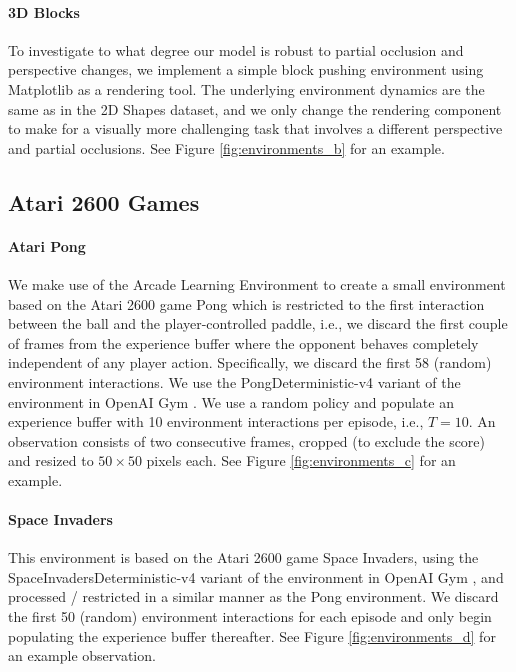 \documentclass{article} %
\begin{document}
\paragraph{3D Blocks}
To investigate to what degree our model is robust to partial occlusion and perspective changes, we implement a simple block pushing environment using Matplotlib \citep{hunter2007matplotlib} as a rendering tool. The underlying environment dynamics are the same as in the 2D Shapes dataset, and we only change the rendering component to make for a visually more challenging task that involves a different perspective and partial occlusions. See Figure \ref{fig:environments_b} for an example.

\subsection{Atari 2600 Games}
\paragraph{Atari Pong} We make use of the Arcade Learning Environment \citep{bellemare2013arcade} to create a small environment based on the Atari 2600 game Pong which is restricted to the first interaction between the ball and the player-controlled paddle, i.e., we discard the first couple of frames from the experience buffer where the opponent behaves completely independent of any player action. Specifically, we discard the first 58 (random) environment interactions. We use the {\sc PongDeterministic-v4} variant of the environment in OpenAI Gym \citep{brockman2016openai}. We use a random policy and populate an experience buffer with 10 environment interactions per episode, i.e., $T=10$. An observation consists of two consecutive frames, cropped (to exclude the score) and resized to $50\times50$ pixels each. See Figure \ref{fig:environments_c} for an example.

\paragraph{Space Invaders} This environment is based on the Atari 2600 game Space Invaders, using the {\sc SpaceInvadersDeterministic-v4} variant of the environment in OpenAI Gym \citep{brockman2016openai}, and processed / restricted in a similar manner as the Pong environment. We discard the first 50 (random) environment interactions for each episode and only begin populating the experience buffer thereafter. See Figure \ref{fig:environments_d} for an example observation.
\end{document}
